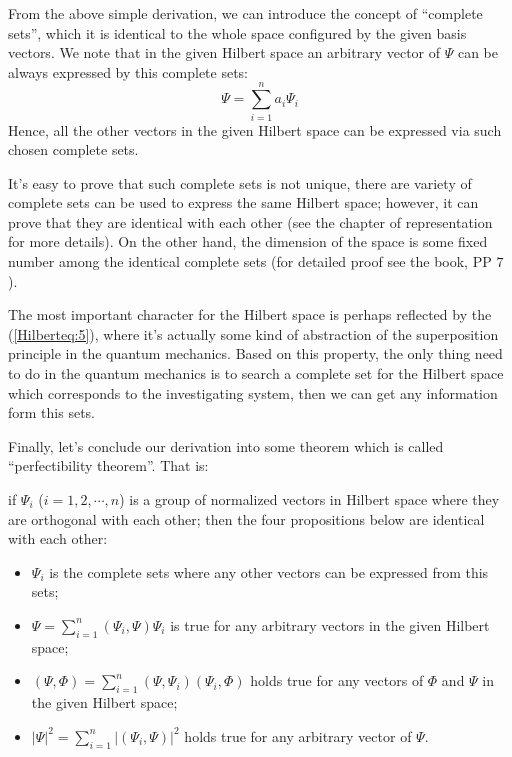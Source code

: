 From the above simple derivation, we can introduce the concept of
``complete sets'', which it is identical to the whole space configured
by the given basis vectors. We note that in the given Hilbert space an
arbitrary vector of $\Psi$ can be always expressed by this complete
sets:
\begin{equation}\label{Hilberteq:5}
\Psi = \sum^{n}_{i=1}a_{i}\Psi_{i}
\end{equation}
Hence, all the other vectors in the given Hilbert space can be
expressed via such chosen complete sets.

It's easy to prove that such complete sets is not unique, there are
variety of complete sets can be used to express the same Hilbert
space; however, it can prove that they are identical with each other
(see the chapter of representation for more details). On the other
hand, the dimension of the space is some fixed number among the
identical complete sets (for detailed proof see the
book\cite{XingLinKe}, PP $7$).

The most important character for the Hilbert space is perhaps
reflected by the (\ref{Hilberteq:5}), where it's actually some kind
of abstraction of the superposition principle in the quantum
mechanics. Based on this property, the only thing need to do in the
quantum mechanics is to search a complete set for the Hilbert space
which corresponds to the investigating system, then we can get any
information form this sets.

Finally, let's conclude our derivation into some theorem which is
called ``perfectibility theorem''. That is:
\begin{theorem}
\label{Hilbert:1}
if $\Psi_{i}$ ($i=1,2,\cdots, n$) is a group of
normalized vectors in Hilbert space where they are orthogonal with
each other; then the four propositions below are identical with each
other:
\begin{itemize}
  \item $\Psi_{i}$ is the complete sets where any other vectors can
  be expressed from this sets;
  \item $\Psi = \sum^{n}_{i=1}(\Psi_{i}, \Psi)\Psi_{i}$ is true for
  any arbitrary vectors in the given Hilbert space;
  \item $(\Psi, \Phi) = \sum^{n}_{i=1}(\Psi, \Psi_{i})(\Psi_{i},
  \Phi)$ holds true for any vectors of $\Phi$ and $\Psi$ in the
  given Hilbert space;
  \item $|\Psi|^{2} = \sum^{n}_{i=1}|(\Psi_{i}, \Psi)|^{2}$ holds
  true for any arbitrary vector of $\Psi$.
\end{itemize}
\end{theorem}

